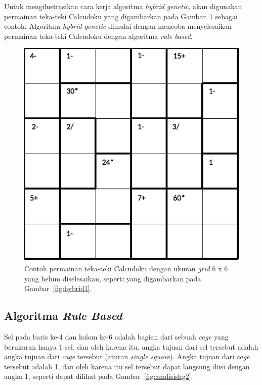 Untuk mengilustrasikan cara kerja algoritma \textit{hybrid genetic}, akan digunakan permainan teka-teki Calcudoku yang digambarkan pada Gambar~\ref{fig:analisishg1} sebagai contoh. Algoritma \textit{hybrid genetic} dimulai dengan mencoba menyelesaikan permainan teka-teki Calcudoku dengan algoritma \textit{rule based}.

\begin{figure}
\centering
\captionsetup{justification=centering}
\includegraphics[scale=0.333]{Gambar/hybridgenetic/Puzzle}
\caption[Contoh permainan teka-teki Calcudoku dengan ukuran \textit{grid} 6 x 6 yang belum diselesaikan, seperti yang digambarkan pada Gambar~\ref{fig:hybrid1}. \cite{johanna:12:hybrid}]{Contoh permainan teka-teki Calcudoku dengan ukuran \textit{grid} 6 x 6 yang belum diselesaikan, seperti yang digambarkan pada Gambar~\ref{fig:hybrid1}. \cite{johanna:12:hybrid}}
\label{fig:analisishg1}
\end{figure}

\subsection{Algoritma \textit{Rule Based}}
\label{sec:analisisrb}

Sel pada baris ke-4 dan kolom ke-6 adalah bagian dari sebuah \textit{cage} yang berukuran hanya 1 sel, dan oleh karena itu, angka tujuan dari sel tersebut adalah angka tujuan dari \textit{cage} tersebut (aturan \textit{single square}). Angka tujuan dari \textit{cage} tersebut adalah 1, dan oleh karena itu sel tersebut dapat langsung diisi dengan angka 1, seperti dapat dilihat pada Gambar~\ref{fig:analisishg2}.

